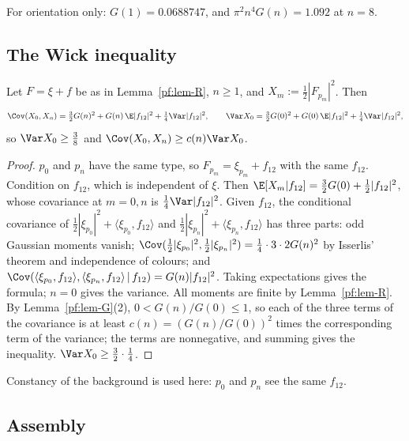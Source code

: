 For orientation only: $G(1)=0.0688747$, and $\pi^2n^4G(n)=1.092$ at $n=8$.

\subsection{The Wick inequality}\label{pf:sec-wick}

\begin{lemma}\label{pf:lem-wick}
Let $F=\xi+f$ be as in Lemma~\ref{pf:lem-R}, $n\ge1$, and $X_m:=\tfrac12|F_{p_m}|^2$. Then
\[
\Cov(X_0,X_n)=\tfrac32G(n)^2+G(n)\,\E|f_{12}|^2+\tfrac14\Var|f_{12}|^2,\qquad
\Var X_0=\tfrac32G(0)^2+G(0)\,\E|f_{12}|^2+\tfrac14\Var|f_{12}|^2,
\]
so $\Var X_0\ge\tfrac38$ and $\Cov(X_0,X_n)\ge c(n)\Var X_0$.
\end{lemma}

\begin{proof}
$p_0$ and $p_n$ have the same type, so $F_{p_m}=\xi_{p_m}+f_{12}$ with the same $f_{12}$. Condition on $f_{12}$, which is independent of $\xi$. Then $\E[X_m|f_{12}]=\tfrac32G(0)+\tfrac12|f_{12}|^2$, whose covariance at $m=0,n$ is $\tfrac14\Var|f_{12}|^2$. Given $f_{12}$, the conditional covariance of $\tfrac12|\xi_{p_0}|^2+\langle\xi_{p_0},f_{12}\rangle$ and $\tfrac12|\xi_{p_n}|^2+\langle\xi_{p_n},f_{12}\rangle$ has three parts: odd Gaussian moments vanish; $\Cov(\tfrac12|\xi_{p_0}|^2,\tfrac12|\xi_{p_n}|^2)=\tfrac14\cdot3\cdot2G(n)^2$ by Isserlis' theorem and independence of colours; and $\Cov(\langle\xi_{p_0},f_{12}\rangle,\langle\xi_{p_n},f_{12}\rangle\,|\,f_{12})=G(n)|f_{12}|^2$. Taking expectations gives the formula; $n=0$ gives the variance. All moments are finite by Lemma~\ref{pf:lem-R}. By Lemma~\ref{pf:lem-G}(2), $0<G(n)/G(0)\le1$, so each of the three terms of the covariance is at least $c(n)=(G(n)/G(0))^2$ times the corresponding term of the variance; the terms are nonnegative, and summing gives the inequality. $\Var X_0\ge\frac32\cdot\frac14$.
\end{proof}

Constancy of the background is used here: $p_0$ and $p_n$ see the same $f_{12}$.

\subsection{Assembly}\label{pf:sec-assembly}

